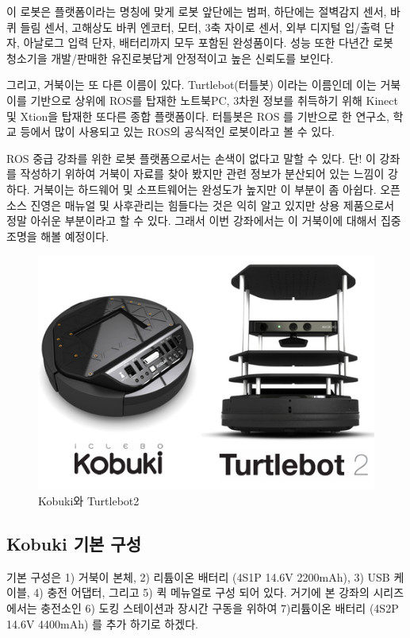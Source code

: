 이 로봇은 플랫폼이라는 명칭에 맞게 로봇 앞단에는 범퍼, 하단에는 절벽감지 센서, 바퀴 들림 센서, 고해상도 바퀴 엔코터, 모터, 3축 자이로 센서, 외부 디지털 입/출력 단자, 아날로그 입력 단자, 배터리까지 모두 포함된 완성품이다. 성능 또한 다년간 로봇 청소기을 개발/판매한 유진로봇답게 안정적이고 높은 신뢰도를 보인다. 

그리고, 거북이는 또 다른 이름이 있다. Turtlebot(터틀봇) 이라는 이름인데 이는 거북이를 기반으로 상위에 ROS를 탑재한 노트북PC, 3차원 정보를 취득하기 위해 Kinect 및 Xtion을 탑재한 또다른 종합 플랫폼이다. 터틀봇은 ROS 를 기반으로 한 연구소, 학교 등에서 많이 사용되고 있는 ROS의 공식적인 로봇이라고 볼 수 있다. 

ROS 중급 강좌를 위한 로봇 플랫폼으로서는 손색이 없다고 말할 수 있다. 단! 이 강좌를 작성하기 위하여 거북이 자료를 찾아 봤지만 관련 정보가 분산되어 있는 느낌이 강하다. 거북이는 하드웨어 및 소프트웨어는 완성도가 높지만 이 부분이 좀 아쉽다. 오픈소스 진영은 매뉴얼 및 사후관리는 힘들다는 것은 익히 알고 있지만 상용 제품으로서 정말 아쉬운 부분이라고 할 수 있다. 그래서 이번 강좌에서는 이 거북이에 대해서 집중 조명을 해볼 예정이다.

\begin{figure}[h]
\centering\includegraphics[width=0.5\columnwidth]{pictures/chapter10/kobuki_turtlebot2.png}
\caption{Kobuki와 Turtlebot2}
\end{figure}

\subsection{Kobuki 기본 구성}

기본 구성은 1) 거북이 본체, 2) 리튬이온 배터리 (4S1P 14.6V 2200mAh), 3) USB 케이블, 4) 충전 어댑터, 그리고 5) 퀵 메뉴얼로 구성 되어 있다. 거기에 본 강좌의 시리즈에서는 충전소인 6) 도킹 스테이션과 장시간 구동을 위하여 7)리튬이온 배터리 (4S2P 14.6V 4400mAh) 를 추가 하기로 하겠다.

